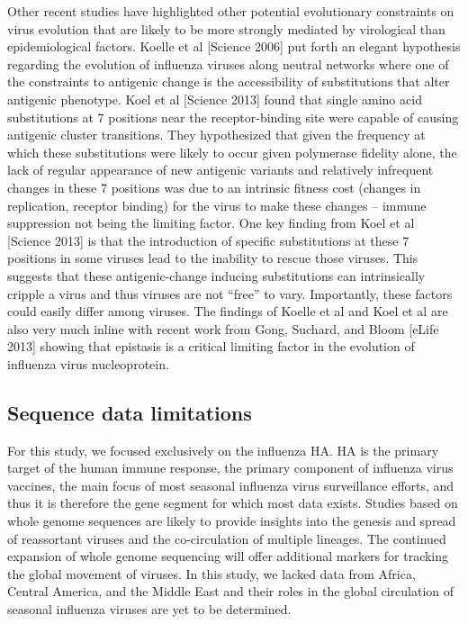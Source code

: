 \documentclass[11pt,oneside,letterpaper]{article}
\begin{document}
Other recent studies have highlighted other potential evolutionary constraints on virus evolution that are likely to be more strongly mediated by virological than epidemiological factors.
Koelle et al [Science 2006] put forth an elegant hypothesis regarding the evolution of influenza viruses along neutral networks where one of the constraints to antigenic change is the accessibility of substitutions that alter antigenic phenotype.
Koel et al [Science 2013] found that single amino acid substitutions at 7 positions near the receptor-binding site were capable of causing antigenic cluster transitions.
They hypothesized that given the frequency at which these substitutions were likely to occur given polymerase fidelity alone, the lack of regular appearance of new antigenic variants and relatively infrequent changes in these 7 positions was due to an intrinsic fitness cost (changes in replication, receptor binding) for the virus to make these changes – immune suppression not being the limiting factor.
One key finding from Koel et al [Science 2013] is that the introduction of specific substitutions at these 7 positions in some viruses lead to the inability to rescue those viruses.
This suggests that these antigenic-change inducing substitutions can intrinsically cripple a virus and thus viruses are not “free” to vary.
Importantly, these factors could easily differ among viruses.
The findings of Koelle et al and Koel et al are also very much inline with recent work from Gong, Suchard, and Bloom [eLife 2013] showing that epistasis is a critical limiting factor in the evolution of influenza virus nucleoprotein.



\subsection*{Sequence data limitations}

For this study, we focused exclusively on the influenza HA. HA is the primary target of the human immune response, the primary component of influenza virus vaccines, the main focus of most seasonal influenza virus surveillance efforts, and thus it is therefore the gene segment for which most data exists.
Studies based on whole genome sequences are likely to provide insights into the genesis and spread of reassortant viruses and the co-circulation of multiple lineages.
The continued expansion of whole genome sequencing will offer additional markers for tracking the global movement of viruses.
In this study, we lacked data from Africa, Central America, and the Middle East and their roles in the global circulation of seasonal influenza viruses are yet to be determined.



\end{document}
